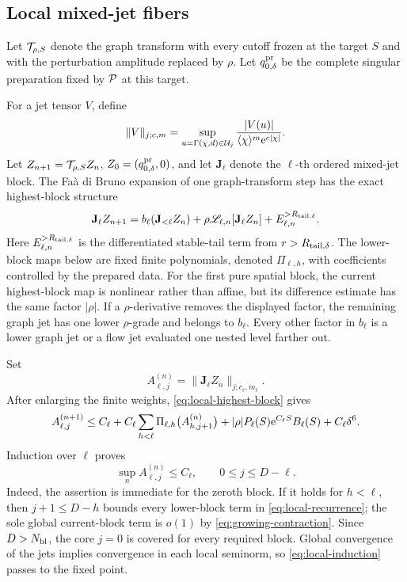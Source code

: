 \subsection{Local mixed-jet fibers}

Let \(\mathcal T_{\rho,S}\) denote the graph transform with every cutoff frozen at
the target \(S\) and with the perturbation amplitude replaced by \(\rho\).
Let \(q_{0,\delta}^{\rm pr}\) be the complete singular preparation fixed by
\(\mathcal P\) at this target.

For a jet tensor \(V\), define
\[
 \|V\|_{j;c,m}
 =\sup_{u=\Gamma(\chi,d)\in\mathcal U_j}
 \frac{|V(u)|}{\langle\chi\rangle^m\mathrm e^{c|\chi|}}.
\]
Let \(Z_{n+1}=\mathcal T_{\rho,S}Z_n\),
\(Z_0=(q_{0,\delta}^{\rm pr},0)\), and let
\(\mathbf J_\ell\) denote the \(\ell\)-th ordered mixed-jet block.  The
Faà di Bruno expansion of one graph-transform step has the exact
highest-block structure
\begin{equation}
\label{eq:local-highest-block}
 \mathbf J_\ell Z_{n+1}
 =b_\ell(\mathbf J_{<\ell}Z_n)
  +\rho\mathscr L_{\ell,n}[\mathbf J_\ell Z_n]
  +E_{\ell,n}^{>R_{{\rm tail},\delta}}.
\end{equation}
Here \(E_{\ell,n}^{>R_{{\rm tail},\delta}}\) is the differentiated stable-tail
term from \(r>R_{{\rm tail},\delta}\).  The lower-block maps below are fixed
finite polynomials,
denoted \(\Pi_{\ell,h}\), with coefficients controlled by the prepared data.
For the first pure spatial block, the current highest-block map is nonlinear
rather than affine, but its difference estimate has the same factor
\(|\rho|\).  If a \(\rho\)-derivative removes the displayed factor, the
remaining graph jet has one lower \(\rho\)-grade and belongs to
\(b_\ell\).  Every other factor in \(b_\ell\) is a lower graph jet or a
flow jet evaluated one nested level farther out.

Set
\[
 A_{\ell,j}^{(n)}
 =\|\mathbf J_\ell Z_n\|_{j;c_\ell,m_\ell}.
\]
After enlarging the finite weights, \cref{eq:local-highest-block} gives
\begin{equation}
\label{eq:local-recurrence}
 A_{\ell,j}^{(n+1)}
 \le C_\ell+
 C_\ell\sum_{h<\ell}\Pi_{\ell,h}
      \bigl(A_{h,j+1}^{(n)}\bigr)
 +|\rho|P_\ell(S)\mathrm e^{C_\ell S}B_\ell(S)
 +C_\ell\delta^6 .
\end{equation}
Induction over \(\ell\) proves
\begin{equation}
\label{eq:local-induction}
 \sup_nA_{\ell,j}^{(n)}\le C_\ell,
 \qquad 0\le j\le D-\ell.
\end{equation}
Indeed, the assertion is immediate for the zeroth block.  If it holds for
\(h<\ell\), then \(j+1\le D-h\) bounds every lower-block term in
\cref{eq:local-recurrence}; the sole global current-block term is
\(o(1)\) by \cref{eq:growing-contraction}.  Since
\(D>N_{\rm bl}\), the core \(j=0\) is covered for every required block.
Global convergence of the jets implies convergence in each local seminorm,
so \cref{eq:local-induction} passes to the fixed point.

